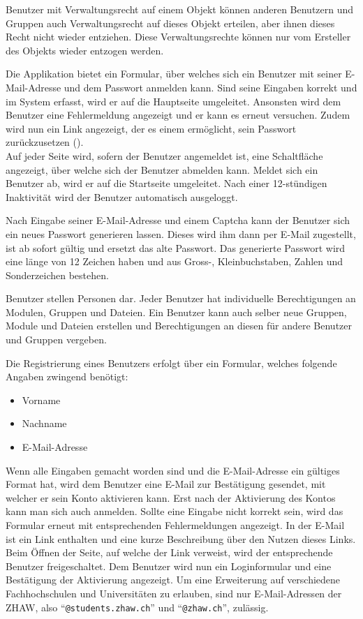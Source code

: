 Benutzer mit Verwaltungsrecht auf einem Objekt können anderen Benutzern und Gruppen auch Verwaltungsrecht auf dieses Objekt erteilen, aber ihnen dieses Recht nicht wieder entziehen. Diese Verwaltungsrechte können nur vom Ersteller des Objekts wieder entzogen werden.


Die Applikation bietet ein Formular, über welches sich ein Benutzer mit seiner E-Mail-Adresse und dem Passwort anmelden kann. Sind seine Eingaben korrekt und im System erfasst, wird er auf die Hauptseite umgeleitet. Ansonsten  wird dem Benutzer eine Fehlermeldung angezeigt und er kann es erneut versuchen. Zudem wird nun ein Link angezeigt, der es einem ermöglicht, sein Passwort zurückzusetzen ().\\

Auf jeder Seite wird, sofern der Benutzer angemeldet ist, eine Schaltfläche angezeigt, über welche sich der Benutzer abmelden kann. Meldet sich ein Benutzer ab, wird er auf die Startseite umgeleitet. Nach einer 12-stündigen Inaktivität wird der Benutzer automatisch ausgeloggt.

Nach Eingabe seiner E-Mail-Adresse und einem \gls{Captcha} kann der Benutzer sich ein neues Passwort generieren lassen. Dieses wird ihm dann per E-Mail zugestellt, ist ab sofort gültig und ersetzt das alte Passwort. Das generierte Passwort wird eine länge von 12 Zeichen haben und aus Gross-, Kleinbuchstaben, Zahlen und Sonderzeichen bestehen. 

Benutzer stellen Personen dar. Jeder Benutzer hat individuelle Berechtigungen an Modulen, Gruppen und Dateien. Ein Benutzer kann auch selber neue Gruppen, Module und Dateien erstellen und Berechtigungen an diesen für andere Benutzer und Gruppen vergeben.

Die Registrierung eines Benutzers erfolgt über ein Formular, welches folgende Angaben zwingend benötigt:
\begin{itemize}
\item Vorname
\item Nachname
\item E-Mail-Adresse
\end{itemize}
Wenn alle Eingaben gemacht worden sind und die E-Mail-Adresse ein gültiges Format hat, wird dem Benutzer eine E-Mail zur Bestätigung gesendet, mit welcher er sein Konto aktivieren kann. Erst nach der Aktivierung des Kontos kann man sich auch anmelden. Sollte eine Eingabe nicht korrekt sein, wird das Formular erneut mit entsprechenden Fehlermeldungen angezeigt. In der E-Mail ist ein Link enthalten und eine kurze Beschreibung über den Nutzen dieses Links. Beim Öffnen der Seite, auf welche der Link verweist, wird der entsprechende Benutzer freigeschaltet. Dem Benutzer wird nun ein Loginformular und eine Bestätigung der Aktivierung angezeigt.
Um eine Erweiterung auf verschiedene Fachhochschulen und Universitäten zu erlauben, sind nur E-Mail-Adressen der ZHAW, also "`\texttt{@students.zhaw.ch}"' und "`\texttt{@zhaw.ch}"', zulässig.

